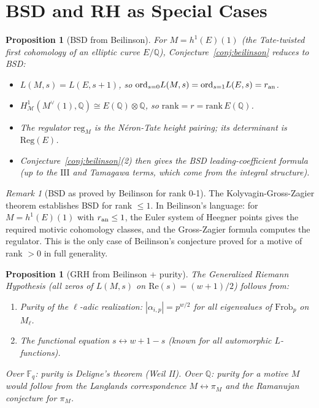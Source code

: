 \documentclass[12pt]{article}
\newtheorem{proposition}[theorem]{Proposition}
\theoremstyle{definition}
\theoremstyle{remark}
\newtheorem{remark}[theorem]{Remark}
\begin{document}
\section{BSD and RH as Special Cases}

\begin{proposition}[BSD from Beilinson]\label{prop:bsdbeil}
For $M = h^1(E)(1)$ (the Tate-twisted first cohomology of an elliptic curve
$E/\mathbb{Q}$), Conjecture~\ref{conj:beilinson} reduces to BSD:
\begin{itemize}
\item $L(M,s) = L(E,s+1)$, so $\mathrm{ord}_{s=0}L(M,s) = \mathrm{ord}_{s=1}L(E,s) = r_{\rm an}$.
\item $H^1_{\mathcal{M}}(M^\vee(1),\mathbb{Q}) \cong E(\mathbb{Q})\otimes\mathbb{Q}$,
  so $\mathrm{rank} = r = \mathrm{rank}\,E(\mathbb{Q})$.
\item The regulator $\mathrm{reg}_M$ is the N\'eron-Tate height pairing; its
  determinant is $\mathrm{Reg}(E)$.
\item Conjecture~\ref{conj:beilinson}(2) then gives the BSD leading-coefficient
  formula (up to the $\mathrm{III}$ and Tamagawa terms, which come from
  the integral structure).
\end{itemize}
\end{proposition}

\begin{remark}[BSD as proved by Beilinson for rank 0-1]
The Kolyvagin-Gross-Zagier theorem establishes BSD for rank $\leq 1$.
In Beilinson's language: for $M = h^1(E)(1)$ with $r_{\rm an}\leq 1$,
the Euler system of Heegner points gives the required motivic cohomology classes,
and the Gross-Zagier formula computes the regulator. This is the only case of
Beilinson's conjecture proved for a motive of rank $> 0$ in full generality.
\end{remark}

\begin{proposition}[GRH from Beilinson + purity]\label{prop:grh}
The Generalized Riemann Hypothesis (all zeros of $L(M,s)$ on $\mathrm{Re}(s) = (w+1)/2$)
follows from:
\begin{enumerate}
\item Purity of the $\ell$-adic realization: $|\alpha_{i,p}| = p^{w/2}$ for all
  eigenvalues of $\mathrm{Frob}_p$ on $M_\ell$.
\item The functional equation $s\leftrightarrow w+1-s$ (known for all automorphic $L$-functions).
\end{enumerate}
Over $\mathbb{F}_q$: purity is Deligne's theorem (Weil II). Over $\mathbb{Q}$:
purity for a motive $M$ would follow from the Langlands correspondence
$M\leftrightarrow\pi_M$ and the Ramanujan conjecture for $\pi_M$.
\end{proposition}
\end{document}
